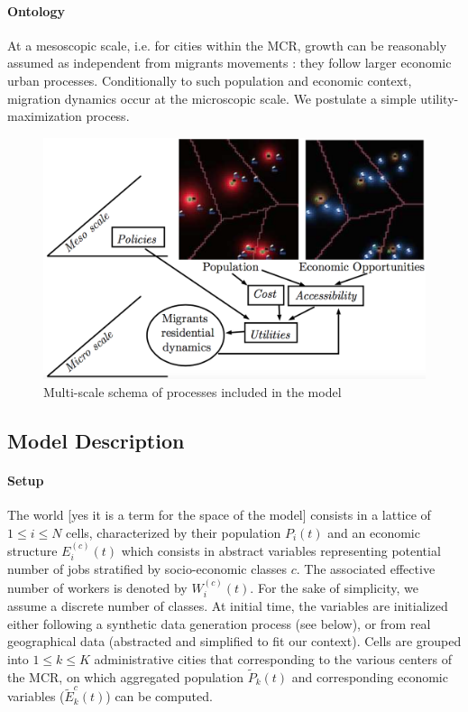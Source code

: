 \paragraph{Ontology} At a mesoscopic scale, i.e. for cities within the MCR, growth can be reasonably assumed as independent from migrants movements : they follow larger economic urban processes. Conditionally to such population and economic context, migration dynamics occur at the microscopic scale. We postulate a simple utility-maximization process.


\begin{figure}
\centering
\includegraphics[width=\textwidth]{figures/model}
\caption{Multi-scale schema of processes included in the model}
\label{fig:model}
\end{figure}


\subsection{Model Description}

\paragraph{Setup}

The world [yes it is a term for the space of the model] consists in a lattice of $1 \leq i \leq N$ cells, characterized by their population $P_i(t)$ and an economic structure $E_i^{(c)}(t)$ which consists in abstract variables representing potential number of jobs stratified by socio-economic classes $c$. The associated effective number of workers is denoted by $W_i^{(c)}(t)$. For the sake of simplicity, we assume a discrete number of classes. At initial time, the variables are initialized either following a synthetic data generation process (see below), or from real geographical data (abstracted and simplified to fit our context). Cells are grouped into $1\leq k\leq K$ administrative cities that corresponding to the various centers of the MCR, on which aggregated population $\tilde{P}_k(t)$ and corresponding economic variables ($\tilde{E}_k^{c}(t)$) can be computed.


